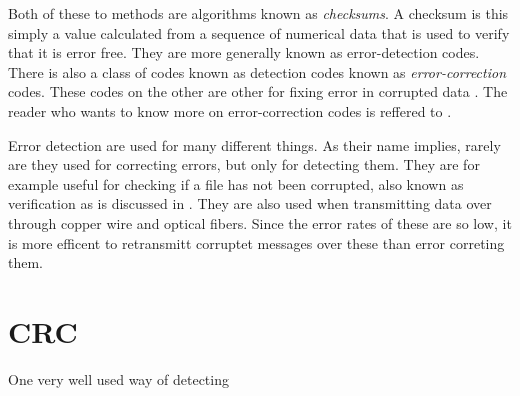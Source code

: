 Both of these to methods are algorithms known as
\textit{checksums}. A checksum is this simply a value
calculated from a sequence of numerical data that is used to verify
that it is error free. They are more generally known as
error-detection codes. There is also a class of codes known as
detection codes known as \textit{error-correction} codes. These codes
on the other are other for fixing error in corrupted data
\cite{tanenbaum2003computernetworks_crc}. The reader who wants to know
more on error-correction codes is reffered to \cite{tanenbaum2003computernetworks_crc,1950hamming_codes_crc_parity}.

Error detection are used for many different things. As their name
implies, rarely are they used for correcting errors, but only for
detecting them. They are for example useful for checking if a file has
not been corrupted, also known as verification as is discussed in
\cite{Nelson:1992:FVU:135011.135017_crc32}. They are also used when
transmitting data over through copper wire and optical fibers. Since
the error rates of these are so low, it is more efficent to
retransmitt corruptet messages over these than error correting
them\cite{tanenbaum2003computernetworks_crc}.

\section{CRC}

One very well used way of detecting

\cite{Ritter:1986:GCM:12647.12648}

\cite{Williams_1993_crc_painless}

\cite{tanenbaum2003computernetworks_crc}

\cite{Nelson:1992:FVU:135011.135017_crc32}

\cite{Stigge06reversingcrc}

\cite{Peterson_Brown_1961_crc_orig}

\cite{gailly96:_zlib_compr_data_format_specif}

\cite{1950hamming_codes_crc_parity}
